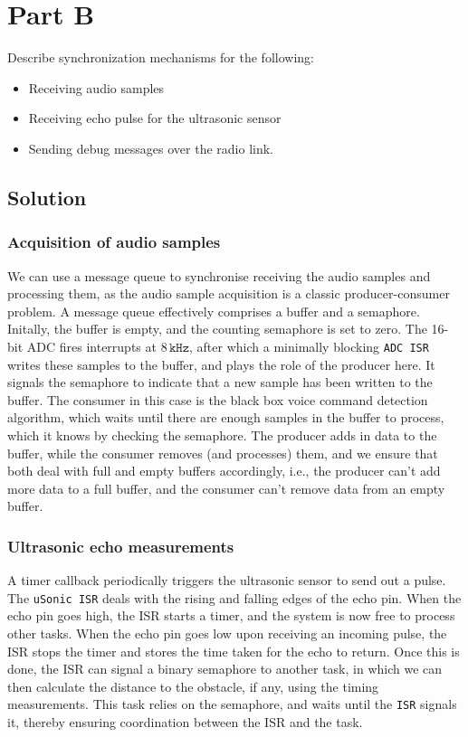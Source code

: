 \section*{Part B}

Describe synchronization mechanisms for the following:
\begin{itemize}[noitemsep, topsep=0pt]
    \item Receiving audio samples
    \item Receiving echo pulse for the ultrasonic sensor
    \item Sending debug messages over the radio link.
\end{itemize}

\subsection*{Solution}

\subsubsection*{Acquisition of audio samples}

We can use a message queue to synchronise receiving the audio samples and processing them, as the audio sample acquisition is a classic producer-consumer problem.
A message queue effectively comprises a buffer and a semaphore.
Initally, the buffer is empty, and the counting semaphore is set to zero.
The 16-bit ADC fires interrupts at \( 8\,\texttt{kHz} \), after which a minimally blocking \texttt{ADC ISR} writes these samples to the buffer, and plays the role of the producer here.
It signals the semaphore to indicate that a new sample has been written to the buffer.
The consumer in this case is the black box voice command detection algorithm, which waits until there are enough samples in the buffer to process, which it knows by checking the semaphore.
The producer adds in data to the buffer, while the consumer removes (and processes) them, and we ensure that both deal with full and empty buffers accordingly, i.e., the producer can't add more data to a full buffer, and the consumer can't remove data from an empty buffer.

\subsubsection*{Ultrasonic echo measurements}

A timer callback periodically triggers the ultrasonic sensor to send out a pulse.
The \texttt{uSonic ISR} deals with the rising and falling edges of the echo pin.
When the echo pin goes high, the ISR starts a timer, and the system is now free to process other tasks.
When the echo pin goes low upon receiving an incoming pulse, the ISR stops the timer and stores the time taken for the echo to return.
Once this is done, the ISR can signal a binary semaphore to another task, in which we can then calculate the distance to the obstacle, if any, using the timing measurements.
This task relies on the semaphore, and waits until the \texttt{ISR} signals it, thereby ensuring coordination between the ISR and the task.

